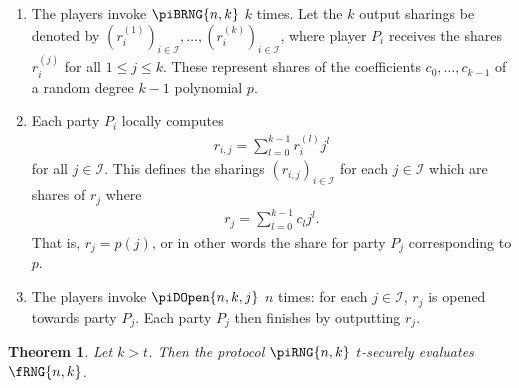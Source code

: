 \documentclass{article}
\newtheorem{theorem}{Theorem}
\theoremstyle{remark}
\begin{document}
\begin{enumerate}
	\item\label{enum:rngCoeff} The players invoke $\piBRNG{n,k}$ $k$ times. Let
		the $k$ output sharings be denoted by ${\left(r_i^{(1)}\right)}_{i \in
		\mathcal{I}}, \ldots, {\left(r_i^{(k)}\right)}_{i \in \mathcal{I}}$,
		where player $P_i$ receives the shares $r_i^{(j)}$ for all $1 \le j \le
		k$. These represent shares of the coefficients $c_0, \ldots, c_{k-1}$
		of a random degree $k-1$ polynomial $p$.

	\item\label{enum:rngrij} Each party $P_i$ locally computes
		\begin{align*}
			r_{i,j} = \sum_{l=0}^{k-1} r_i^{(l)} j^l
		\end{align*}
		for all $j \in \mathcal{I}$. This defines the sharings ${(r_{i,j})}_{i
		\in \mathcal{I}}$ for each $j \in \mathcal{I}$ which are shares of
		$r_j$ where
		\begin{align*}
			r_j = \sum_{l=0}^{k-1} c_l j^l.
		\end{align*}
		That is, $r_j = p(j)$, or in other words the share for party $P_j$
		corresponding to $p$.

	\item\label{enum:rngDO} The players invoke $\piDOpen{n,k,j}$ $n$ times: for
		each $j \in \mathcal{I}$, $r_j$ is opened towards party $P_j$. Each
		party $P_j$ then finishes by outputting $r_j$.
\end{enumerate}

\begin{theorem}\label{thm:rng}
	Let $k > t$. Then the protocol $\piRNG{n,k}$ $t$-securely evaluates
	$\fRNG{n,k}$.
\end{theorem}
\end{document}

